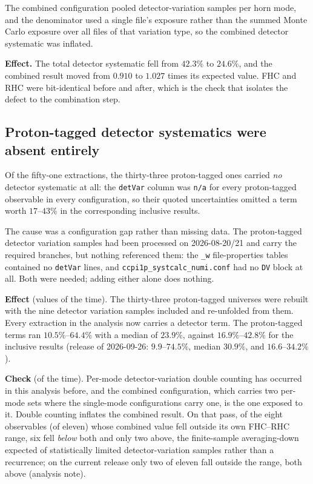The combined configuration pooled detector-variation samples per horn mode, and the
denominator used a single file's exposure rather than the summed Monte Carlo exposure over
all files of that variation type, so the combined detector systematic was inflated.

\textbf{Effect.} The total detector systematic fell from $42.3\%$ to $24.6\%$, and the
combined result moved from $0.910$ to $1.027$ times its expected value.  FHC and RHC were
bit-identical before and after, which is the check that isolates the defect to the
combination step.

\subsection{Proton-tagged detector systematics were absent entirely}

Of the fifty-one extractions, the thirty-three proton-tagged ones carried \emph{no}
detector systematic at all: the \texttt{detVar} column was \texttt{n/a} for every
proton-tagged observable in every configuration, so their quoted uncertainties omitted a
term worth $17$--$43\%$ in the corresponding inclusive results.

The cause was a configuration gap rather than missing data.  The proton-tagged detector
variation samples had been processed on 2026-08-20/21 and carry the required branches, but
nothing referenced them: the \texttt{\_w} file-properties tables contained no
\texttt{detVar} lines, and \texttt{ccpi1p\_systcalc\_numi.conf} had no \texttt{DV} block
at all.  Both were needed; adding either alone does nothing.

\textbf{Effect} (values of the time).  The thirty-three proton-tagged universes were rebuilt
with the nine detector variation samples included and re-unfolded from them.  Every
extraction in the analysis now carries a detector term.  The proton-tagged terms ran
$10.5\%$--$64.4\%$ with a median of $23.9\%$, against $16.9\%$--$42.8\%$ for the inclusive
results (release of 2026-09-26: $9.9$--$74.5\%$, median $30.9\%$, and $16.6$--$34.2\%$).

\textbf{Check} (of the time).  Per-mode detector-variation double counting has occurred in
this analysis before, and the combined configuration, which carries two per-mode sets
where the single-mode configurations carry one, is the one exposed to it.  Double
counting inflates the combined result.  On that pass, of the eight observables (of eleven)
whose combined value fell outside its own FHC--RHC range, six fell \emph{below} both and
only two above, the finite-sample averaging-down expected of statistically limited
detector-variation samples rather than a recurrence; on the current release only two of
eleven fall outside the range, both above (analysis note).

